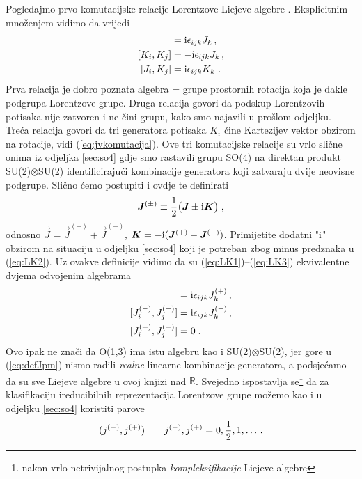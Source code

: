 Pogledajmo prvo komutacijske relacije Lorentzove Liejeve algebre . Eksplicitnim
množenjem vidimo da vrijedi
\begin{align}
[J_i, J_j] &= \rmi\epsilon_{ijk} J_k  \,, \label{eq:LK1}\\
[K_i, K_j] &= -\rmi\epsilon_{ijk} J_k \,, \label{eq:LK2} \\
[J_i, K_j] &= \rmi\epsilon_{ijk} K_k \;. \label{eq:LK3}
\end{align}
Prva relacija je dobro poznata algebra = grupe prostornih rotacija
koja je dakle podgrupa Lorentzove grupe.
Druga relacija govori da podskup Lorentzovih potisaka nije zatvoren
i ne čini grupu, kako smo najavili u prošlom odjeljku. Treća
relacija govori da tri generatora potisaka $K_i$ čine Kartezijev vektor obzirom
na rotacije, vidi (\ref{eq:jvkomutacija}).
Ove tri komutacijske relacije su vrlo slične onima iz odjeljka \ref{sec:so4} gdje smo 
rastavili grupu SO(4) na direktan produkt SU(2)$\otimes$SU(2) identificirajući
kombinacije generatora koji zatvaraju dvije neovisne podgrupe.
Slično ćemo postupiti i ovdje te definirati
\begin{equation}
  \vec{J}^{(\pm)} \equiv \fhalf \big(\vec{J}\pm \rmi \vec{K} \big) \;,
  \label{eq:defJpm}
\end{equation}
odnosno $\vec{J}=\vec{J}^{(+)}+\vec{J}^{(-)}$, $\vec{K} = -\rmi
(\vec{J}^{(+)}-\vec{J}^{(-)})$. Primijetite dodatni "$\textrm{i}$" obzirom
na situaciju u odjeljku \ref{sec:so4} koji je potreban zbog
minus predznaka u (\ref{eq:LK2}).
Uz ovakve definicije vidimo da su (\ref{eq:LK1})--(\ref{eq:LK3}) ekvivalentne
dvjema odvojenim  algebrama
\begin{align}
[J_{i}^{(+)}, J_{j}^{(+)}] &= \rmi \epsilon_{ijk} J_{k}^{(+)} \,, \\
[J_{i}^{(-)}, J_{j}^{(-)}] &= \rmi \epsilon_{ijk} J_{k}^{(-)} \,, \\
[J_{i}^{(+)}, J_{j}^{(-)}] &= 0  \;.
\end{align}
Ovo ipak ne znači  da O(1,3) ima istu algebru kao i SU(2)$\otimes$SU(2),
jer gore u (\ref{eq:defJpm})  nismo radili \emph{realne} linearne kombinacije generatora,
a podsjećamo da su sve Liejeve algebre u ovoj knjizi nad $\mathbb{R}$.
Svejedno ispostavlja se\footnote{nakon vrlo netrivijalnog postupka \emph{kompleksifikacije}
Liejeve algebre} da za klasifikaciju ireducibilnih reprezentacija Lorentzove
grupe možemo kao i u odjeljku \ref{sec:so4} koristiti parove
\begin{equation}
(j^{(-)}, j^{(+)})  \qquad j^{(-)}, j^{(+)} = 0, \frac{1}{2}, 1, \dotsc .
\end{equation}
